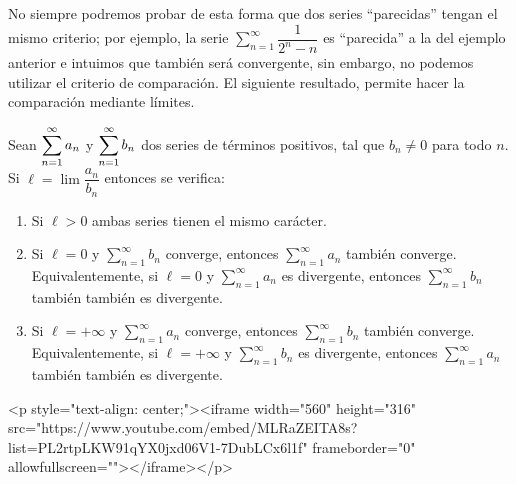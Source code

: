 No siempre podremos probar de esta forma que dos series ``parecidas'' tengan el mismo criterio;
por ejemplo, la serie $\displaystyle\sum_{n=1}^\infty  \dfrac{1}{2^n-n}$ es ``parecida'' a la del ejemplo anterior e intuimos que también será convergente, sin embargo, no podemos utilizar el criterio de comparación.
El siguiente resultado, permite hacer la comparación mediante límites.

\begin{teorema} 
Sean $\displaystyle\displaystyle\sum_{n=1}^\infty  a_n$ y
$\displaystyle\displaystyle\sum_{n=1}^\infty  b_n$ dos series de términos positivos, tal que $b_n\neq 0$
para todo $n$. Si $\ell=\lim\dfrac{a_n}{b_n}$ entonces se verifica:
\begin{enumerate}
\item Si $\ell >0$ ambas series tienen el mismo carácter.
\item Si $\ell =0$ y $\displaystyle\sum_{n=1}^\infty  b_n$ converge, entonces $\displaystyle\sum_{n=1}^\infty  a_n$
también converge.
Equivalentemente, si $\ell =0$ y $\displaystyle\sum_{n=1}^\infty  a_n$ es divergente, entonces $\displaystyle\sum_{n=1}^\infty  b_n$
también también es divergente.
\item Si $\ell =+\infty$ y $\displaystyle\sum_{n=1}^\infty  a_n$ converge, entonces $\displaystyle\sum_{n=1}^\infty  b_n$
también converge.
Equivalentemente, si $\ell =+\infty$ y $\displaystyle\sum_{n=1}^\infty  b_n$ es divergente, entonces $\displaystyle\sum_{n=1}^\infty  a_n$
también también es divergente.
\end{enumerate}
\end{teorema}
\begin{rawhtml}
<p style="text-align: center;"><iframe width="560" height="316" src="https://www.youtube.com/embed/MLRaZEITA8s?list=PL2rtpLKW91qYX0jxd06V1-7DubLCx6l1f" frameborder="0" allowfullscreen=""></iframe></p>
\end{rawhtml}
